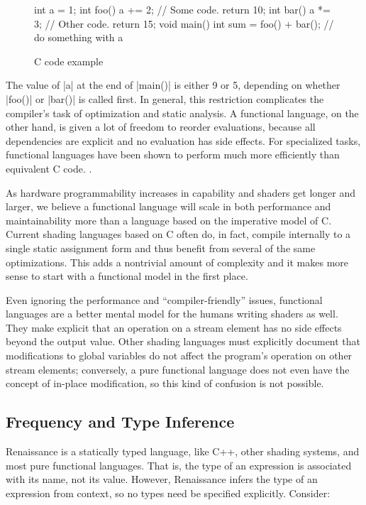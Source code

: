 \documentclass[review]{acmsiggraph}      %
\begin{document}
\begin{figure}[htb]
\begin{MyVerb}
int a = 1;
int foo() {
  a += 2;
  // Some code.
  return 10;
}
int bar() {
  a *= 3;
  // Other code.
  return 15;
}
void main() {
  int sum = foo() + bar();
  // do something with a
}
\end{MyVerb}
\caption{C code example}
\label{CExample}
\end{figure}

The value of |a| at the end of |main()| is either 9 or 5, depending on
whether |foo()| or |bar()| is called first.  In general, this
restriction complicates the compiler's task of optimization and static
analysis.  A functional language, on the other hand, is given a lot of
freedom to reorder evaluations, because all dependencies are explicit
and no evaluation has side effects.  For specialized tasks, functional
languages have been shown to perform much more efficiently than
equivalent C code. \cite{ocaml,clean,sac}.

As hardware programmability increases in capability and shaders get
longer and larger, we believe a functional language will scale in both
performance and maintainability more than a language based on the
imperative model of C.  Current shading languages based on C often do,
in fact, compile internally to a single static assignment form and
thus benefit from several of the same optimizations.  This adds a
nontrivial amount of complexity and it makes more sense to start with
a functional model in the first place.

Even ignoring the performance and ``compiler-friendly'' issues,
functional languages are a better mental model for the humans writing
shaders as well.  They make explicit that an operation on a stream
element has no side effects beyond the output value.  Other shading
languages must explicitly document that modifications to global
variables do not affect the program's operation on other stream
elements; conversely, a pure functional language does not even have
the concept of in-place modification, so this kind of confusion is not
possible.


\subsection{Frequency and Type Inference}


Renaissance is a statically typed language, like C++, other shading
systems, and most pure functional languages.  That is, the type of an
expression is associated with its name, not its value.  However,
Renaissance infers the type of an expression from context, so no types
need be specified explicitly.  Consider:
\end{document}

